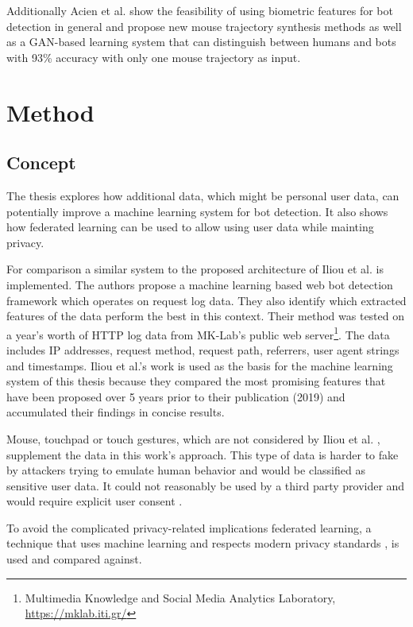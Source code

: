 \documentclass[
    fontsize=12pt,
    headings=small,
    parskip=half,           %
    bibliography=totoc,
    numbers=noenddot,       %
    open=any,               %
    final                   %
    ]{scrreprt}
\begin{document}
Additionally Acien et al. \cite{Acien2020BeCAPTCHAMouseSM} show the feasibility of using biometric features for bot detection in general and propose new mouse trajectory synthesis methods as well as a GAN-based learning system that can distinguish between humans and bots with 93\% accuracy with only one mouse trajectory as input.


\chapter{Method}


\section{Concept}

The thesis explores how additional data, which might be personal user data, can potentially improve a machine learning system for bot detection. It also shows how federated learning can be used to allow using user data while mainting privacy.

For comparison a similar system to the proposed architecture of Iliou et al. \cite{10.1145/3339252.3339267} is implemented. The authors propose a machine learning based web bot detection framework which operates on request log data. They also identify which extracted features of the data perform the best in this context. Their method was tested on a year's worth of HTTP log data from MK-Lab's public web server\footnote{Multimedia Knowledge and Social Media Analytics Laboratory, \url{https://mklab.iti.gr/}}. The data includes IP addresses, request method, request path, referrers, user agent strings and timestamps.
Iliou et al.'s work is used as the basis for the machine learning system of this thesis because they compared the most promising features that have been proposed over 5 years prior to their publication (2019) and accumulated their findings in concise results.

Mouse, touchpad or touch gestures, which are not considered by Iliou et al. \cite{10.1145/3339252.3339267}, supplement the data in this work's approach. This type of data is harder to fake by attackers trying to emulate human behavior and would be classified as sensitive user data. It could not reasonably be used by a third party provider and would require explicit user consent \cite{GDPR}.

To avoid the complicated privacy-related implications federated learning, a technique that uses machine learning and respects modern privacy standards \cite{DBLP:journals/corr/KonecnyMR15} \cite{DBLP:journals/corr/KonecnyMRR16}, is used and compared against.
\end{document}
